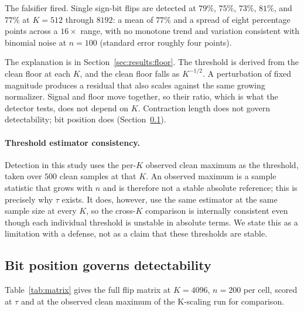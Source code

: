 \documentclass[11pt]{article}
\begin{document}
The falsifier fired. Single sign-bit flips are detected at $79\%$, $75\%$,
$73\%$, $81\%$, and $77\%$ at $K = 512$ through $8192$: a mean of $77\%$ and a
spread of eight percentage points across a $16\times$ range, with no monotone
trend and variation consistent with binomial noise at $n = 100$ (standard error
roughly four points).

The explanation is in Section~\ref{sec:results:floor}. The threshold is derived
from the clean floor at each $K$, and the clean floor falls as $K^{-1/2}$. A
perturbation of fixed magnitude produces a residual that also scales against
the same growing normalizer. Signal and floor move together, so their ratio,
which is what the detector tests, does not depend on $K$. Contraction length
does not govern detectability; bit position does
(Section~\ref{sec:results:bitclass}).

\paragraph{Threshold estimator consistency.}
Detection in this study uses the per-$K$ observed clean maximum as the
threshold, taken over $500$ clean samples at that $K$. An observed maximum is a
sample statistic that grows with $n$ and is therefore not a stable absolute
reference; this is precisely why $\tau$ exists. It does, however, use the same
estimator at the same sample size at every $K$, so the cross-$K$ comparison is
internally consistent even though each individual threshold is unstable in
absolute terms. We state this as a limitation with a defense, not as a claim
that these thresholds are stable.

\subsection{Bit position governs detectability}
\label{sec:results:bitclass}

Table~\ref{tab:matrix} gives the full flip matrix at $K = 4096$, $n = 200$ per
cell, scored at $\tau$ and at the observed clean maximum of the K-scaling run
for comparison.
\end{document}
